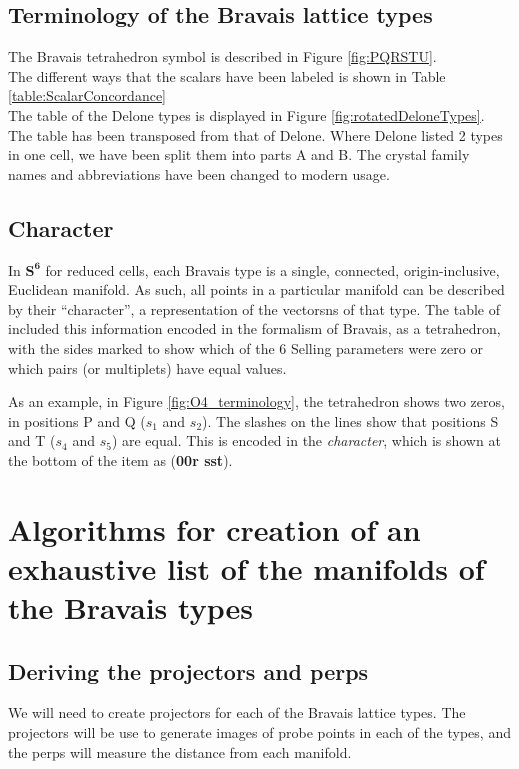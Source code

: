 \documentclass[preprint]{iucr}              %
\newcommand{\SVI}[0]{$\mathbf{S^{6}}$}
\newcommand{\scalarsub}[2]{$#1_#2$}
\newcommand{\charseq}[1]{({\bf #1})}
\begin{document}
	\subsection{Terminology of the Bravais lattice types}
	The Bravais tetrahedron symbol is described in Figure \ref{fig:PQRSTU}.\\
	The different ways that the scalars have been labeled is shown in Table \ref{table:ScalarConcordance} \\
	The table of the Delone types is displayed in Figure \ref{fig:rotatedDeloneTypes}. The table has been transposed from that of Delone. Where Delone listed 2 types in one cell, we have been split them into parts A and B. The crystal family names and abbreviations have been changed to modern usage. \\
	
	\subsection{Character}
	In \SVI{} for reduced cells, each Bravais type is a single, connected,
	origin-inclusive, Euclidean manifold. As such, all points in a
	particular manifold can be described by their ``character'', 
	a representation of the vectorsns of that type. The table of  included this information 
	encoded in the formalism of Bravais, as a tetrahedron, with
	the sides marked to show which of the 6 Selling parameters were
	zero or which pairs (or multiplets) have equal values. 
	
	As an example, in Figure \ref{fig:O4_terminology}, the tetrahedron shows two
	zeros, in positions P and Q (\scalarsub{s}{1} and \scalarsub{s}{2}). The slashes on the lines
	show that positions S and T (\scalarsub{s}{4} and \scalarsub{s}{5}) are equal. This is 
	encoded in the \textit{character}, which is shown at the bottom of the item as \charseq{00r sst}.
	
	\section{Algorithms for creation of an exhaustive list of the manifolds of the Bravais types}
	
	\subsection{Deriving the projectors and perps}
	
	We will need to create projectors for each of the Bravais
	lattice types. The projectors will be use to generate
	images of probe points in each of the types, and the perps
	will measure the distance from each manifold.
	
\end{document}
